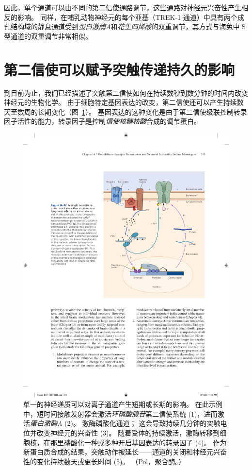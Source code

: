 因此，单个通道可以由不同的第二信使通路调节，这些通路对神经元兴奋性产生相反的影响。
同样，在哺乳动物神经元的每个亚基（TREK-1 通道）中具有两个成孔结构域的静息通道受到\textit{蛋白激酶A}和\textit{花生四烯酸}的双重调节，其方式与海兔中 S 型通道的双重调节非常相似。



\section{第二信使可以赋予突触传递持久的影响}

到目前为止，我们已经描述了突触第二信使如何在持续数秒到数分钟的时间内改变神经元的生物化学。
由于细胞特定基因表达的改变，第二信使还可以产生持续数天至数周的长期变化（图~\ref{fig:14_12}）。 
基因表达的这种变化是由于第二信使级联控制转录因子活性的能力，转录因子是控制\textit{信使核糖核酸}合成的调节蛋白。


\begin{figure}[htbp]
	\centering
	\includegraphics[width=0.7\linewidth]{chap14/fig_14_12}
	\caption{单一的神经递质可以对离子通道产生短期或长期的影响。
		在此示例中，短时间接触发射器会激活\textit{环磷酸腺苷}第二信使系统 (1)，进而激活\textit{蛋白激酶A} (2)。
		激酶磷酸化通道；
		这会导致持续几分钟的突触电位并改变神经元的兴奋性 (3)。
		随着受体的持续激活，激酶转移到细胞核，在那里磷酸化一种或多种开启基因表达的转录因子 (4)。
		作为新蛋白质合成的结果，突触动作被延长——通道的关闭和神经元兴奋性的变化持续数天或更长时间 (5)。
		（Pol，聚合酶。）}
	\label{fig:14_12}
\end{figure}


